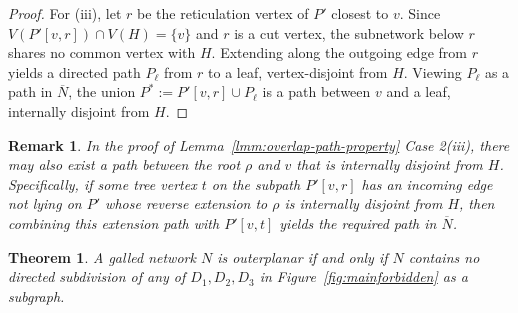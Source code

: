 \documentclass[pdflatex,sn-mathphys-num]{sn-jnl}
\theoremstyle{thmstyleone}%
\newtheorem{theorem}{Theorem}%
\theoremstyle{thmstyletwo}%
\newtheorem{remark}{Remark}%
\theoremstyle{thmstylethree}%
\begin{document}
\begin{proof}
For (iii), let $r$ be the reticulation vertex of $P'$ closest to $v$. Since $V(P'[v,r]) \cap V(H)=\{v\}$ and $r$ is a cut vertex, the subnetwork below $r$ shares no common vertex with $H$. Extending along the outgoing edge from $r$ yields a directed path $P_{\ell}$ from $r$ to a leaf, vertex-disjoint from $H$. Viewing $P_{\ell}$ as a path in $\overline N$, the union $P^*:=P'[v,r]\cup P_{\ell}$ is a path between $v$ and a leaf, internally disjoint from $H$.
\end{proof}


\begin{remark}\label{rmk:to-root}
In the proof of Lemma~\ref{lmm:overlap-path-property} Case 2(iii), there may also exist a path between the root $\rho$ and $v$ that is internally disjoint from $H$. Specifically, if some tree vertex $t$ on the subpath $P'[v, r]$ has an incoming edge not lying on $P'$ whose reverse extension to $\rho$ is internally disjoint from $H$, then combining this extension path with $P'[v, t]$ yields the required path in $\overline{N}$.
\end{remark}








\begin{theorem}\label{outer forbidden}
A galled network $N$ is outerplanar if and only if $N$ contains no directed subdivision of any of $D_1,D_2,D_3$ in Figure~\ref{fig:mainforbidden} as a subgraph.
\end{theorem}
\end{document}
